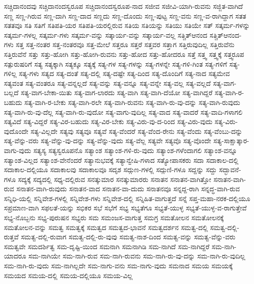 {ಸಚ್ಚಿದಾನಂದವು
ಸಚ್ಚಿದಾನಂದಸ್ವರೂಪ
ಸಚ್ಚಿದಾನಂದಸ್ವರೂಪ-ನಾದ
ಸಜೀವ
ಸಜೀವಿ-ಯಾಗಿ-ರುವನು
ಸಜ್ಜಿತ-ವಾಗಿದೆ
ಸಣ್ಣ
ಸಣ್ಣ-ಗಿರುವ
ಸಣ್ಣ-ದಾಗಿ
ಸಣ್ಣ-ದಾದ
ಸಣ್ಣದು
ಸಣ್ಣ-ದೊಂದು
ಸಣ್ಣ-ಪುಟ್ಟ
ಸಣ್ಣ-ವನು
ಸಣ್ಣ-ವ-ರಾಗಿದ್ದಾಗ
ಸತತ
ಸತತವೂ
ಸತಿ
ಸತಿಗೆ
ಸತಿಪತಿ-ಯರ
ಸತಿಪತಿ-ಯರಲ್ಲಿರುವ
ಸತಿಯ
ಸತಿಯನ್ನು
ಸತಿಯು
ಸತಿಯೇ
ಸತ್
ಸತ್ಕರ್ಮ-ಗಳನ್ನು
ಸತ್ಕರ್ಮ-ಗಳಲ್ಲ
ಸತ್ಕರ್ಮ-ಗಳು
ಸತ್ಕರ್ಮ-ವನ್ನು
ಸತ್ಕಾರ್ಯ-ವನ್ನು
ಸತ್ಕಾರ್ಯ-ವಲ್ಲ
ಸತ್ಚಿತ್ಆನಂದ
ಸತ್ಚಿತ್ಆನಂದ-ಗಳು
ಸತ್ತ
ಸತ್ತ-ನಂತರ
ಸತ್ತ-ನಂತರವೂ
ಸತ್ತ-ಮೇಲೆ
ಸತ್ತರೂ
ಸತ್ತರೆ
ಸತ್ತವರ
ಸತ್ತಾಗ
ಸತ್ತಿರುವುದಿಲ್ಲ
ಸತ್ತಿರುವೆನು
ಸತ್ತಿರುವೆನೆ
ಸತ್ತು
ಸತ್ತು-ಹೋಗಿ
ಸತ್ತು-ಹೋಗಿ-ರುವನು
ಸತ್ತು-ಹೋದ
ಸತ್ತು-ಹೋದರೂ
ಸತ್ತೆ
ಸತ್ತ್ವ
ಸತ್ತ್ವಕ್ಕೆ
ಸತ್ತ್ವರೂಪ
ಸತ್ಪುರುಷರಿಗೆ
ಸತ್ಯ
ಸತ್ಯಕ್ಕಾಗಿ
ಸತ್ಯಕ್ಕೂ
ಸತ್ಯಕ್ಕೆ
ಸತ್ಯ-ಗಳ
ಸತ್ಯ-ಗಳನ್ನು
ಸತ್ಯ-ಗಳನ್ನೇ
ಸತ್ಯ-ಗಳಿ-ಗಿಂತ
ಸತ್ಯ-ಗಳಿಗೆ
ಸತ್ಯ-ಗಳಿಲ್ಲ
ಸತ್ಯ-ಗಳು
ಸತ್ಯದ
ಸತ್ಯ-ದಂತೆ
ಸತ್ಯ-ದಲ್ಲಿ
ಸತ್ಯ-ದಷ್ಟೇ
ಸತ್ಯ-ದಿಂದ
ಸತ್ಯ-ದೊಂದಿಗೆ
ಸತ್ಯ-ನಾದ
ಸತ್ಯಮೇವ
ಸತ್ಯವಂತ
ಸತ್ಯ-ವಂತರೂ
ಸತ್ಯ-ವನ್ನಲ್ಲದೆ
ಸತ್ಯ-ವನ್ನು
ಸತ್ಯ-ವನ್ನೂ
ಸತ್ಯ-ವನ್ನೇ
ಸತ್ಯ-ವಲ್ಲ
ಸತ್ಯ-ವಲ್ಲದೆ
ಸತ್ಯ-ವಾಗ-ಬಲ್ಲದೆ
ಸತ್ಯ-ವಾಗ-ಬೇಕಾ-ಯಿತು
ಸತ್ಯ-ವಾಗ-ಲಾರದು
ಸತ್ಯ-ವಾಗಿ
ಸತ್ಯ-ವಾಗಿ-ದೆಯೋ
ಸತ್ಯ-ವಾಗಿದ್ದರೆ
ಸತ್ಯ-ವಾಗಿ-ರ-ಬಹುದು
ಸತ್ಯ-ವಾಗಿ-ರ-ಬೇಕು
ಸತ್ಯ-ವಾಗಿ-ರಲೇ
ಸತ್ಯ-ವಾಗಿ-ರುವನು
ಸತ್ಯ-ವಾಗಿ-ರು-ವು-ದನ್ನು
ಸತ್ಯ-ವಾಗಿ-ರುವುದು
ಸತ್ಯ-ವಾಗಿ-ರು-ವು-ದೆಲ್ಲ
ಸತ್ಯ-ವಾಗಿ-ರು-ವುದೋ
ಸತ್ಯ-ವಾಗು-ವುದಿಲ್ಲ
ಸತ್ಯ-ವಾದ
ಸತ್ಯ-ವಾದರೆ
ಸತ್ಯ-ವಾದಿ-ಗಳಾಗಲಿ
ಸತ್ಯವಿದೆ
ಸತ್ಯ-ವಿದ್ದರೆ
ಸತ್ಯ-ವಿರ-ಬಹುದು
ಸತ್ಯ-ವಿರ-ಬೇಕು
ಸತ್ಯ-ವಿರು-ವು-ದ-ರಿಂದ
ಸತ್ಯ-ವಿರು-ವುದು
ಸತ್ಯ-ವಿರು-ವುದೊಂದೇ
ಸತ್ಯ-ವಿಲ್ಲದೇ
ಸತ್ಯವು
ಸತ್ಯವೂ
ಸತ್ಯವೆ
ಸತ್ಯ-ವೆಂದರೆ
ಸತ್ಯ-ವೆಂದ-ರೇನು
ಸತ್ಯ-ವೆಂದು
ಸತ್ಯ-ವೆಂಬು-ದನ್ನು
ಸತ್ಯ-ವೆನ್ನು-ವರು
ಸತ್ಯ-ವೆನ್ನು-ವು-ದನ್ನು
ಸತ್ಯ-ವೆನ್ನು-ವುದು
ಸತ್ಯ-ವೆಲ್ಲ
ಸತ್ಯವೇ
ಸತ್ಯವೊ
ಸತ್ಯ-ವೊಂದೇ
ಸತ್ಯ-ಸಾಕ್ಷಾತ್ಕಾರ-ವಾಗು-ವುದು
ಸತ್ಯಸ್ಯ
ಸತ್ಯಸ್ವರೂಪನೊ
ಸತ್ಯಾಂಶ
ಸತ್ಯಾಂಶ-ಗಳಿ-ರು-ವುದು
ಸತ್ಯಾಂಶ-ಗಳೆಂದಾಗಲಿ
ಸತ್ಯಾಂಶ-ವನ್ನೂ
ಸತ್ಯಾಂಶ-ವಿಲ್ಲದ
ಸತ್ಯಾಂಶ-ವೇನೆಂದರೆ
ಸತ್ಯಾನುಭವಕ್ಕೆ
ಸತ್ಯಾನ್ವೇಷಿ-ಗಳಾದ
ಸತ್ಯೋಪಾಸಕರು
ಸದಾ
ಸದಾಕಾಲ-ದಲ್ಲಿ
ಸದಾಕಾಲ-ದಲ್ಲಿಯೂ
ಸದಾಕಾಲವು
ಸದಾಕಾಲವೂ
ಸದೃಶ
ಸದ್ಗುಣ-ಗಳಲ್ಲಿ
ಸದ್ಗುಣಿ-ಗಳೂ
ಸದ್ದನ್ನು
ಸದ್ದು
ಸದ್ಭಾವನೆ-ಗಳೂ
ಸದ್ಯಕ್ಕೆ
ಸದ್ಯದಲ್ಲಿ
ಸಧ್ಯ-ದಲ್ಲಿರುವ
ಸನತ್ಕುಮಾರ
ಸನತ್ಕುಮಾರರು
ಸನಾತನ
ಸನಾತನ-ವಾಗಿತ್ತೋ
ಸನಾತನ-ವಾಗಿ-ರುವ
ಸನಾತನ-ವಾಗಿ-ರುವುದು
ಸನಾತನ-ವಾದ
ಸನಾತನ-ವಾ-ದುದು
ಸನಾತನವೂ
ಸನ್ನದ್ದ-ರಾಗಿ
ಸನ್ನದ್ಧ-ವಾಗಿ-ರುವ
ಸನ್ನಿಧಿ-ಯಲ್ಲಿ
ಸನ್ನಿವೇಶ-ಗಳಲ್ಲಿ
ಸನ್ನಿವೇಶ-ಗಳು
ಸನ್ನಿವೇಶ-ದಲ್ಲಿ
ಸನ್ನಿಹಿತ-ವಾಗುತ್ತದೆ
ಸನ್ನೆ
ಸಪ್ತ-ಮಹಾ-ನರಕ-ದಲ್ಲಿಯೂ
ಸಪ್ರಮಾಣ-ವಾಗಿ
ಸಫಲತೆ-ಯನ್ನು
ಸಭಿಕರ
ಸಭೆ
ಸಭೆಗೆ
ಸಭ್ಯ
ಸಭ್ಯತೆಗೂ
ಸಭ್ಯತೆ-ಯುಳ್ಳ
ಸಭ್ಯತೆ-ಯುಳ್ಳ-ವ-ರಾಗುತ್ತೇವೆ
ಸಭ್ಯ-ನೊಬ್ಬನು
ಸಭ್ಯ-ಪುರುಷನ
ಸಭ್ಯರು
ಸಮ
ಸಮಂಜಸ-ವಾಗುತ್ತ
ಸಮಗ್ರ
ಸಮತೋಲನ
ಸಮತೋಲನಕ್ಕೆ
ಸಮತೋಲನ-ವನ್ನು
ಸಮತ್ವ
ಸಮತ್ವಕ್ಕೆ
ಸಮತ್ವದ
ಸಮತ್ವದ-ಭಾವನೆ
ಸಮತ್ವದರ್ಶನ
ಸಮತ್ವ-ದಲ್ಲಿ
ಸಮತ್ವ-ದಲ್ಲಿ-ರುತ್ತವೆ
ಸಮತ್ವ-ದಲ್ಲಿ-ರುವಾಗ
ಸಮತ್ವ-ದಲ್ಲಿ-ರು-ವುವು
ಸಮತ್ವ-ನಾಶ-ದಿಂದ
ಸಮತ್ವ-ವನ್ನು
ಸಮತ್ವ-ವೆನ್ನು-ವರು
ಸಮತ್ವವೇ
ಸಮದರ್ಶಿತ್ವ
ಸಮ-ದೃಷ್ಟಿ-ಯಿಂದ
ಸಮನಾಗಿ
ಸಮನಾಗಿಡಿ
ಸಮ-ನಾಗಿದೆ
ಸಮ-ನಾಗಿದ್ದರೆ
ಸಮ-ನಾಗಿ-ಯಾದರೂ
ಸಮ-ನಾಗಿಯೇ
ಸಮ-ನಾಗಿ-ರುವ
ಸಮ-ನಾಗಿ-ರುವನು
ಸಮ-ನಾಗಿ-ರು-ವು-ದನ್ನು
ಸಮ-ನಾಗಿ-ರು-ವುದಿಲ್ಲ
ಸಮ-ನಾಗಿ-ರು-ವುದು
ಸಮ-ನಾಗಿಲ್ಲದೇ
ಸಮ-ನಾಗು-ವನು
ಸಮ-ನಾಗು-ವುದು
ಸಮನಾದ
ಸಮಯ
ಸಮಯಕ್ಕೆ
ಸಮಯದ
ಸಮಯ-ದಲ್ಲಿ
ಸಮಯ-ದಲ್ಲಿಯೂ
ಸಮಯ-ವಿಲ್ಲ
}

